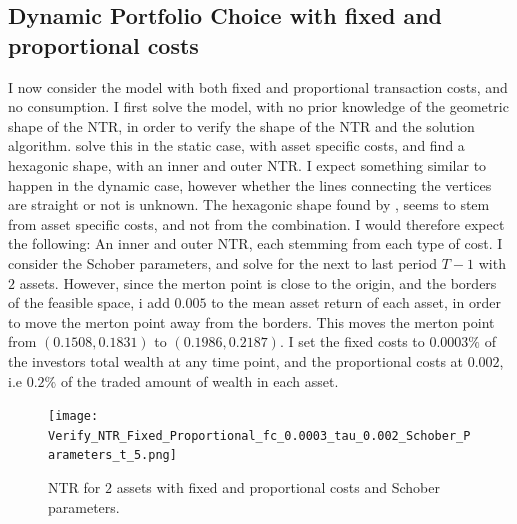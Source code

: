 \documentclass[11pt]{article}
\begin{document}
\subsection{Dynamic Portfolio Choice with fixed and proportional costs}
I now consider the model with both fixed and proportional transaction costs, and no consumption.
I first solve the model, with no prior knowledge of the geometric shape of the \ac{NTR}, in order to verify the shape of the \ac{NTR} and the solution algorithm.
\autocite{Dybvig2020} solve this in the static case, with asset specific costs, and find a hexagonic shape, with an inner and outer NTR.
I expect something similar to happen in the dynamic case, however whether the lines connecting the vertices are straight or not is unknown.
The hexagonic shape found by \autocite{Dybvig2020}, seems to stem from asset specific costs, and not from the combination.
I would therefore expect the following: An inner and outer NTR, each stemming from each type of cost.
I consider the Schober parameters, and solve for the next to last period $T-1$ with $2$ assets.
However, since the merton point is close to the origin, and the borders of the feasible space, i add $0.005$ to the mean asset return of each asset, in order to move the merton point away from the borders.
This moves the merton point from $(0.1508, 0.1831)$ to $(0.1986, 0.2187)$.
I set the fixed costs to $0.0003\%$ of the investors total wealth at any time point,
and the proportional costs at $0.002$, i.e $0.2\%$ of the traded amount of wealth in each asset.
\begin{figure}[!ht]
    \centering
    \texttt{[image: Verify\_NTR\_Fixed\_Proportional\_fc\_0.0003\_tau\_0.002\_Schober\_Parameters\_t\_5.png]}
    \caption{NTR for $2$ assets with fixed and proportional costs and Schober parameters.}
    \label{fig: Final_NTR_Fixed_Proportional}
\end{figure}
\end{document}
